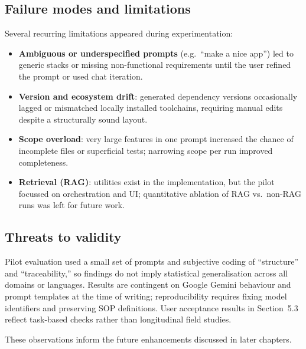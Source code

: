 \subsection{Failure modes and limitations}

Several recurring limitations appeared during experimentation:
\begin{itemize}
    \item \textbf{Ambiguous or underspecified prompts} (e.g.\ ``make a nice app'') led to generic stacks or missing non-functional requirements until the user refined the prompt or used chat iteration.
    \item \textbf{Version and ecosystem drift}: generated dependency versions occasionally lagged or mismatched locally installed toolchains, requiring manual edits despite a structurally sound layout.
    \item \textbf{Scope overload}: very large features in one prompt increased the chance of incomplete files or superficial tests; narrowing scope per run improved completeness.
    \item \textbf{Retrieval (RAG)}: utilities exist in the implementation, but the pilot focussed on orchestration and UI; quantitative ablation of RAG vs.\ non-RAG runs was left for future work.
\end{itemize}

\subsection{Threats to validity}

Pilot evaluation used a small set of prompts and subjective coding of ``structure'' and ``traceability,'' so findings do not imply statistical generalisation across all domains or languages. Results are contingent on Google Gemini behaviour and prompt templates at the time of writing; reproducibility requires fixing model identifiers and preserving SOP definitions. User acceptance results in Section~5.3 reflect task-based checks rather than longitudinal field studies.

These observations inform the future enhancements discussed in later chapters.
